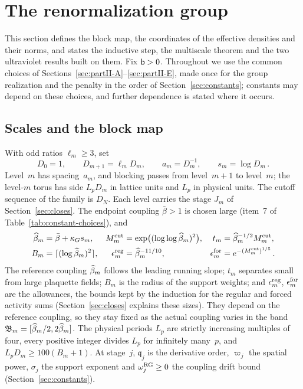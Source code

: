 
\section{The renormalization group}\label{sec:renormalization}

This section defines the block map, the coordinates of the effective densities and their norms, and states the inductive step, the multiscale theorem and the two ultraviolet results built on them. Fix $\mathsf{b}>0$. Throughout we use the common choices of Sections~\ref{sec:partII-A}--\ref{sec:partII-E}, made once for the group realization and the penalty in the order of Section~\ref{sec:constants}; constants may depend on these choices, and further dependence is stated where it occurs.

\subsection{Scales and the block map}\label{sec:block-map}

With odd ratios $\ell_m\ge3$, set
\begin{equation}\label{eq:I12-levels}
D_0=1,\qquad D_{m+1}=\ell_mD_m,\qquad a_m=D_m^{-1},\qquad s_m=\log D_m\,.
\end{equation}
Level~$m$ has spacing~$a_m$, and blocking passes from level~$m+1$ to level~$m$; the level-$m$ torus has side $L_pD_m$ in lattice units and $L_p$ in physical units. The cutoff sequence of the family is $D_N$. Each level carries the stage $J_m$ of Section~\ref{sec:closes}. The endpoint coupling $\bar\beta>1$ is chosen large (item~7 of Table~\ref{tab:constant-choices}), and
\begin{align}\label{eq:I12-scales}
\widehat{\beta}_m&=\bar\beta+\kappa_G s_m,&
M^{\mathrm{cut}}_m&=\exp\bigl((\log\log\widehat{\beta}_m)^2\bigr),&
t_m&=\widehat{\beta}_m^{-1/2}M^{\mathrm{cut}}_m,\\
B_m&=\lceil(\log\widehat{\beta}_m)^2\rceil,&
\epsilon_m^{\rm reg}&=\widehat{\beta}_m^{-11/10},&
\epsilon_m^{\rm for}&=e^{-(M^{\mathrm{cut}}_m)^{1/5}}\,.\label{eq:I12-scales-b}
\end{align}
The reference coupling $\widehat{\beta}_m$ follows the leading running slope; $t_m$ separates small from large plaquette fields; $B_m$ is the radius of the support weights; and $\epsilon_m^{\rm reg}$, $\epsilon_m^{\rm for}$ are the allowances, the bounds kept by the induction for the regular and forced activity sums (Section~\ref{sec:closes} explains these sizes). They depend on the reference coupling, so they stay fixed as the actual coupling varies in the band $\mathfrak B_m=[\widehat{\beta}_m/2,2\widehat{\beta}_m]$. The physical periods $L_p$ are strictly increasing multiples of four, every positive integer divides $L_p$ for infinitely many~$p$, and $L_pD_m\ge100(B_m+1)$. At stage~$j$, $\mathfrak q_j$ is the derivative order, $\varpi_j$ the spatial power, $\sigma_j$ the support exponent and $\omega_j^{\rm RG}\ge0$ the coupling drift bound (Section~\ref{sec:constants}).

